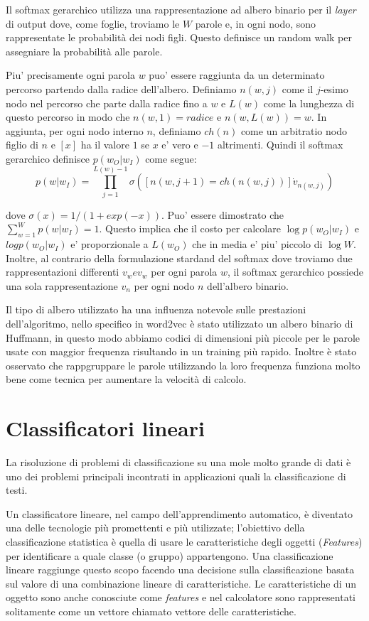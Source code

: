 \documentclass[a4paper,12pt,openright,twoside]{report}
\theoremstyle{definition}
\begin{document}
Il softmax gerarchico utilizza una rappresentazione ad albero binario per il \emph{layer} di output dove, come foglie,
troviamo le $W$ parole e, in ogni nodo, sono rappresentate le probabilità dei nodi figli.
Questo definisce un random walk per assegniare la probabilità alle parole.

Piu' precisamente ogni parola $w$ puo' essere raggiunta da un determinato percorso partendo dalla radice
dell'albero. Definiamo $n(w,j)$ come il $j$-esimo nodo nel percorso che parte dalla radice fino a $w$ e $L(w)$ come
la lunghezza di questo percorso in modo che $n(w,1) = radice$ e $n(w,L(w)) = w$.
In aggiunta, per ogni nodo interno $n$, definiamo $ch(n)$ come un arbitratio nodo figlio di $n$ e $[x]$ ha il valore $1$ se $x$ e' vero e $-1$ altrimenti.
Quindi il softmax gerarchico definisce $p(w_O|w_I)$ come segue:
\begin{equation}
	p(w|w_I) = \prod_{j=1}^{L(w)-1}\sigma([n(w,j+1)=ch(n(w,j))]\dot v_{n(w,j)} )
	\label{eq:hierarchicalSoftmax}
\end{equation}

dove $\sigma(x) = 1/(1+exp(-x))$. Puo' essere dimostrato che $\sum_{w=1}^W p(w|w_I) = 1$. Questo implica
che il costo per calcolare $\log p(w_O|w_I)$ e $log p(w_O|w_I)$ e' proporzionale a $L(w_O)$ che in media
e' piu' piccolo di $\log W$.
Inoltre, al contrario della formulazione stardand del softmax dove troviamo due rappresentazioni differenti 
$v_w e v_w$ per ogni parola $w$, il softmax gerarchico possiede una sola rappresentazione $v_n$ per ogni nodo $n$
dell'albero binario.

Il tipo di albero utilizzato ha una influenza notevole sulle prestazioni dell'algoritmo, nello specifico
in word2vec è stato utilizzato un albero binario di Huffmann, in questo modo 
abbiamo codici di dimensioni più piccole per le parole usate con maggior frequenza risultando in un training più rapido.
Inoltre è stato osservato che rappgruppare le parole utilizzando la loro frequenza funziona molto
bene come tecnica per aumentare la velocità di calcolo.

\section{Classificatori lineari}
La risoluzione di problemi di classificazione su una mole molto grande di dati è uno dei problemi principali
incontrati in applicazioni quali la classificazione di testi.

Un classificatore lineare, nel campo dell'apprendimento automatico, è diventato una delle tecnologie più
promettenti e più utilizzate; l'obiettivo della 
classificazione statistica è quella di usare le caratteristiche degli oggetti (\emph{Features}) per identificare
a quale classe (o gruppo) appartengono. 
Una classificazione lineare raggiunge questo scopo facendo una decisione sulla classificazione basata sul valore di una combinazione lineare di caratteristiche. 
Le caratteristiche di un oggetto sono anche conosciute come \emph{features} e nel calcolatore sono rappresentati solitamente come un vettore chiamato vettore delle caratteristiche.
\end{document}
